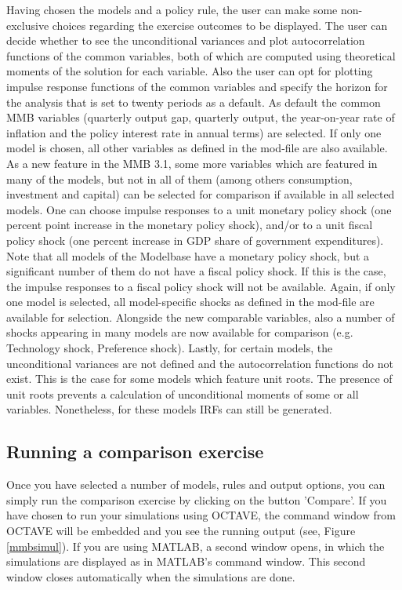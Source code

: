 Having chosen the models and a policy rule, the user can make some non-exclusive choices regarding the exercise outcomes to be displayed.
The user can decide whether to see the unconditional variances and plot autocorrelation functions of the common variables, both of which are computed using theoretical moments of the solution for each variable. Also the user can opt for plotting impulse response functions of the common variables and specify the horizon for the analysis that is set to twenty periods as a default. 
As default the common MMB variables (quarterly output gap, quarterly output, the year-on-year rate of inflation and the policy interest rate in annual terms) are selected. If only one model is chosen, all other variables as defined in the mod-file are also available. As a new feature in the MMB 3.1, some more variables which are featured in many of the models, but not in all of them  (among others consumption, investment and capital) can be selected for comparison if available in all selected models. 
One can choose impulse responses to a unit monetary policy shock (one percent point increase in the monetary policy shock), and/or to a unit fiscal policy shock (one percent increase in GDP share of government expenditures). Note that all models of the Modelbase have a monetary policy shock, but a significant number of them do not have a fiscal policy shock. If this is the case, the impulse responses to a fiscal policy shock will not be available. Again, if only one model is selected, all model-specific shocks as defined in the mod-file are available for selection. Alongside the new comparable variables, also a number of shocks  appearing in many models are now available for comparison (e.g. Technology shock, Preference shock).
Lastly, for certain models, the unconditional variances are not defined and the autocorrelation functions do not exist. This is the case for some models which feature unit roots. The presence of unit roots prevents a calculation of unconditional moments of some or all variables. Nonetheless, for these models IRFs can still be generated. 

\subsection*{Running a comparison exercise}
Once you have selected a number of models, rules and output options, you can simply run the comparison exercise by clicking on the button 'Compare'. If you have chosen to run your simulations using OCTAVE, the command window from OCTAVE will be embedded and you see the running output (see, Figure \ref{mmbsimul}). If you are using MATLAB, a second window opens, in which the simulations are displayed as in MATLAB's command window. This second window closes automatically when the simulations are done.
 
